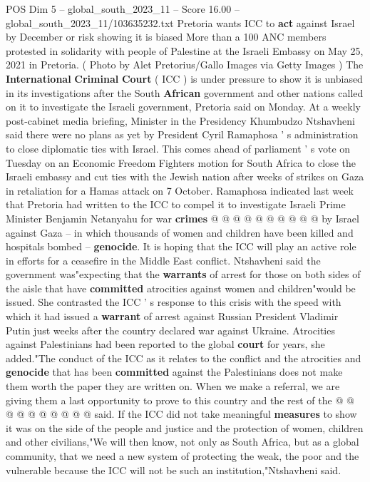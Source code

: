 \begin{textsample}{POS Dim 5 – global\_south\_2023\_11 – Score 16.00 – global\_south\_2023\_11/103635232.txt}  \label{ex:f5_pos_272}
Pretoria wants ICC to \textbf{act} against Israel by December or risk showing it is biased More than a 100 ANC members protested in solidarity with people of Palestine at the Israeli Embassy on May 25, 2021 in Pretoria. ( Photo by Alet Pretorius/Gallo Images via Getty Images ) The \textbf{International} \textbf{Criminal} \textbf{Court} ( ICC ) is under pressure to show it is unbiased in its investigations after the South \textbf{African} government and other nations called on it to investigate the Israeli government, Pretoria said on Monday.
At a weekly post-cabinet media briefing, Minister in the Presidency Khumbudzo Ntshavheni said there were no plans as yet by President Cyril Ramaphosa ' s administration to close diplomatic ties with Israel.
This comes ahead of parliament ' s vote on Tuesday on an Economic Freedom Fighters motion for South Africa to close the Israeli embassy and cut ties with the Jewish nation after weeks of strikes on Gaza in retaliation for a Hamas attack on 7 October.
Ramaphosa indicated last week that Pretoria had written to the ICC to compel it to investigate Israeli Prime Minister Benjamin Netanyahu for war \textbf{crimes} @ @ @ @ @ @ @ @ @ @ by Israel against Gaza -- in which thousands of women and children have been killed and hospitals bombed -- \textbf{genocide}.
It is hoping that the ICC will play an active role in efforts for a ceasefire in the Middle East conflict.
Ntshavheni said the government was"expecting that the \textbf{warrants} of arrest for those on both sides of the aisle that have \textbf{committed} atrocities against women and children"would be issued.
She contrasted the ICC ' s response to this crisis with the speed with which it had issued a \textbf{warrant} of arrest against Russian President Vladimir Putin just weeks after the country declared war against Ukraine.
Atrocities against Palestinians had been reported to the global \textbf{court} for years, she added."The conduct of the ICC as it relates to the conflict and the atrocities and \textbf{genocide} that has been \textbf{committed} against the Palestinians does not make them worth the paper they are written on.
When we make a referral, we are giving them a last opportunity to prove to this country and the rest of the @ @ @ @ @ @ @ @ @ @ said.
If the ICC did not take meaningful \textbf{measures} to show it was on the side of the people and justice and the protection of women, children and other civilians,"We will then know, not only as South Africa, but as a global community, that we need a new system of protecting the weak, the poor and the vulnerable because the ICC will not be such an institution,"Ntshavheni said.

\end{textsample}
